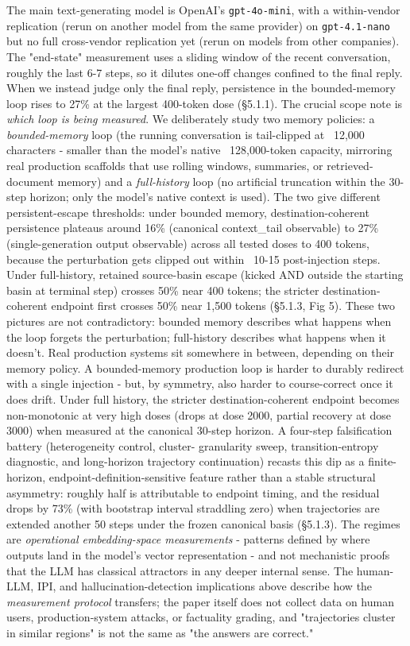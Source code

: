\documentclass{article}
\theoremstyle{plain}
\theoremstyle{definition}
\begin{document}
The main text-generating model is OpenAI's \texttt{gpt-4o-mini}, with a
within-vendor replication (rerun on another model from the same
provider) on \texttt{gpt-4.1-nano} but no full cross-vendor replication yet
(rerun on models from other companies). The "end-state" measurement uses a sliding window of the recent
conversation, roughly the last 6-7 steps, so it dilutes
one-off changes confined to the final reply. When we instead judge
only the final reply, persistence in the bounded-memory loop rises
to 27\% at the largest 400-token dose (§5.1.1). The crucial scope
note is \textit{which loop is being measured}. We deliberately study two
memory policies: a \textit{bounded-memory} loop (the running conversation
is tail-clipped at ~12,000 characters - smaller than the model's
native ~128,000-token capacity, mirroring real production scaffolds
that use rolling windows, summaries, or retrieved-document memory)
and a \textit{full-history} loop (no artificial truncation within the
30-step horizon; only the model's native context is used). The two
give different persistent-escape thresholds: under bounded memory,
destination-coherent persistence plateaus around 16\% (canonical
context\_tail observable) to 27\% (single-generation output observable)
across all tested doses to 400 tokens, because the perturbation gets
clipped out within ~10-15 post-injection steps. Under full-history,
retained source-basin escape (kicked AND outside the starting basin
at terminal step) crosses 50\% near 400 tokens; the stricter
destination-coherent endpoint first crosses 50\% near 1,500 tokens
(§5.1.3, Fig 5). These two pictures are not contradictory: bounded
memory describes what happens when the loop forgets the
perturbation; full-history describes what happens when it doesn't.
Real production systems sit somewhere in between, depending on
their memory policy. A bounded-memory production loop is harder to
durably redirect with a single injection - but, by symmetry, also
harder to course-correct once it does drift. Under full history,
the stricter destination-coherent endpoint becomes non-monotonic at
very high doses (drops at dose 2000, partial recovery at dose
3000) when measured at the canonical 30-step horizon. A
four-step falsification battery (heterogeneity control, cluster-
granularity sweep, transition-entropy diagnostic, and long-horizon
trajectory continuation) recasts this dip as a finite-horizon,
endpoint-definition-sensitive feature rather than a stable
structural asymmetry: roughly half is attributable to endpoint
timing, and the residual drops by 73\% (with bootstrap interval
straddling zero) when trajectories are extended another 50 steps
under the frozen canonical basis (§5.1.3). The regimes are
\textit{operational embedding-space measurements} - patterns defined by
where outputs land in the model's vector representation - and not
mechanistic proofs that the LLM has classical attractors in any
deeper internal sense. The human-LLM,
IPI, and hallucination-detection implications above describe how the
\textit{measurement protocol} transfers; the paper itself does not collect
data on human users, production-system attacks, or factuality
grading, and "trajectories cluster in similar regions" is not the
same as "the answers are correct."
\end{document}
